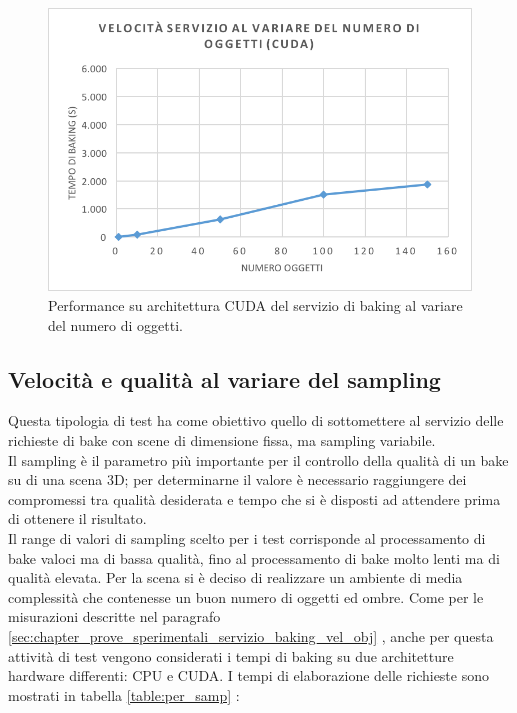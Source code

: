 \begin{figure}[htb]
 \centering
 \includegraphics[width=0.8\linewidth]{images/chapter_prove_sperimentali/grafico2.png}\hfill
 \caption[Performance CUDA variando oggetti]{Performance su architettura CUDA del servizio di baking al variare del numero di oggetti.}
 \label{fig:grafico2}
\end{figure}

\subsection{Velocità e qualità al variare del sampling}
\label{sec:chapter_prove_sperimentali_servizio_baking_vel_sam}

Questa tipologia di test ha come obiettivo quello di sottomettere al servizio delle richieste di bake con scene di dimensione fissa, ma sampling variabile. 
\\
Il sampling è il parametro più importante per il controllo della qualità di un bake su di una scena 3D; per determinarne il valore è necessario raggiungere dei compromessi tra qualità desiderata e tempo che si è disposti ad attendere prima di ottenere il risultato. 
\\
Il range di valori di sampling scelto per i test corrisponde al processamento di  bake valoci ma di bassa qualità, fino al processamento di bake molto lenti ma di qualità elevata. Per la scena si è deciso di realizzare un ambiente di media complessità che contenesse un buon numero di oggetti ed ombre. Come per le misurazioni descritte nel paragrafo \ref{sec:chapter_prove_sperimentali_servizio_baking_vel_obj} , anche per questa attività di test vengono considerati i tempi di baking su due architetture hardware differenti: CPU e CUDA.
I tempi di elaborazione delle richieste sono mostrati in tabella \ref{table:per_samp} :

